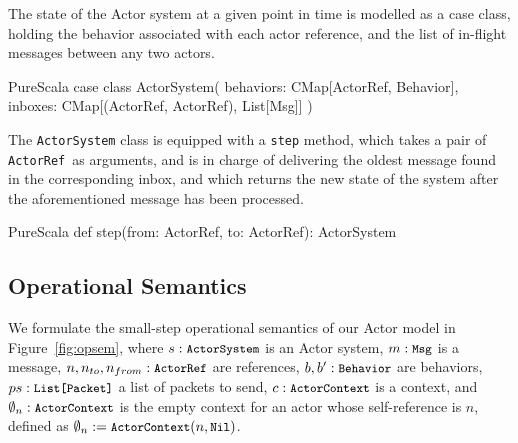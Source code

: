 \documentclass[a4paper,twoside]{article}
\newcommand{\InlineS}[1]{\lstinline[language=PureScala,basicstyle=\small\ttfamily,columns=fixed]|#1|}
\newcommand{\RefFig}[1]{Figure~\ref{#1}}
\newcommand{\ActorRef}{\InlineS{ActorRef}\ }
\newcommand{\stt}[1]{\texttt{\small{#1}}}
\begin{document}
The state of the Actor system at a given point in time is modelled as a case class, 
holding the behavior associated with each actor reference, and the list of in-flight messages between any two actors.


\begin{ShortCode}{PureScala}
case class ActorSystem(
  behaviors: CMap[ActorRef, Behavior],
  inboxes: CMap[(ActorRef, ActorRef), List[Msg]]
)
\end{ShortCode}

The \InlineS{ActorSystem} class is equipped with a \InlineS{step} method, which takes 
a pair of \ActorRef as arguments, and is in charge of delivering the oldest message 
found in the corresponding inbox, and which returns the new state of the system after 
the aforementioned message has been processed.

\begin{ShortCode}{PureScala}
def step(from: ActorRef, to: ActorRef): ActorSystem
\end{ShortCode}

\subsection{Operational Semantics}
\label{semantics}

We formulate the small-step operational semantics of our Actor model in 
\RefFig{fig:opsem}, where $s: \stt{ActorSystem}$ is an Actor system,
$m: \stt{Msg}$ is a message,
$n, n_{to}, n_{from}: \stt{ActorRef}$ are references,
$b, b': \stt{Behavior}$ are behaviors,
$ps: \stt{List[Packet]}$ a list of packets to send,
$c: \stt{ActorContext}$ is a context,
and $\emptyset_n: \stt{ActorContext}$ is the empty context for an actor whose
self-reference is $n$, defined as $\emptyset_n := \stt{ActorContext}(n, \stt{Nil})$.
\end{document}
